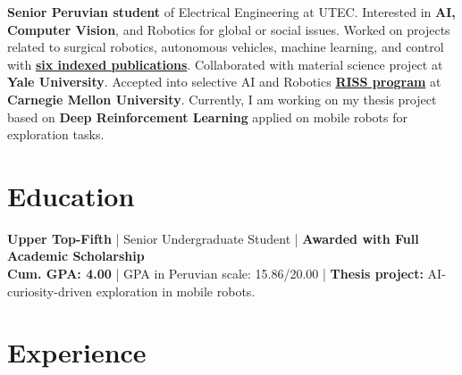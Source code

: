 \documentclass[]{resume-openfont}
\begin{document}
\begin{minipage}[t]{0.95\linewidth} 
\textbf{Senior Peruvian student} of Electrical Engineering at UTEC. Interested in \textbf{AI,  Computer Vision}, and Robotics for global or social issues. Worked on projects related to surgical robotics, autonomous vehicles, machine learning, and control with \href{https://scholar.google.com/citations?user=KjixlLsAAAAJ&hl=es&oi=ao}{\textbf{six indexed publications}}. Collaborated with material science project at \textbf{Yale University}. Accepted into selective AI and Robotics  
\href{https://riss.ri.cmu.edu/}{\textbf{RISS program}} at \textbf{Carnegie Mellon University}. Currently, I am working on my thesis project based on \textbf{Deep Reinforcement Learning} applied on mobile robots for exploration tasks.

\section{Education} 
\textbf{Upper Top-Fifth} | Senior Undergraduate Student |
\textbf{Awarded with Full Academic Scholarship} \\
\textbf{Cum. GPA: 4.00} | GPA in Peruvian scale: 15.86/20.00 | \textbf{Thesis project:} AI-curiosity-driven exploration in mobile robots.


\section{Experience}


\end{minipage}
\end{document}

